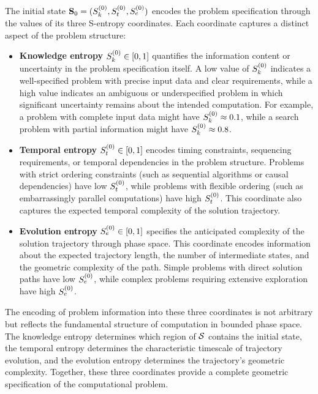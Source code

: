 The initial state $\mathbf{S}_0 = (S_k^{(0)}, S_t^{(0)}, S_e^{(0)})$ encodes the problem specification through the values of its three S-entropy coordinates. Each coordinate captures a distinct aspect of the problem structure:

\begin{itemize}
    \item \textbf{Knowledge entropy} $S_k^{(0)} \in [0,1]$ quantifies the information content or uncertainty in the problem specification itself. A low value of $S_k^{(0)}$ indicates a well-specified problem with precise input data and clear requirements, while a high value indicates an ambiguous or underspecified problem in which significant uncertainty remains about the intended computation. For example, a problem with complete input data might have $S_k^{(0)} \approx 0.1$, while a search problem with partial information might have $S_k^{(0)} \approx 0.8$.
    
    \item \textbf{Temporal entropy} $S_t^{(0)} \in [0,1]$ encodes timing constraints, sequencing requirements, or temporal dependencies in the problem structure. Problems with strict ordering constraints (such as sequential algorithms or causal dependencies) have low $S_t^{(0)}$, while problems with flexible ordering (such as embarrassingly parallel computations) have high $S_t^{(0)}$. This coordinate also captures the expected temporal complexity of the solution trajectory.
    
    \item \textbf{Evolution entropy} $S_e^{(0)} \in [0,1]$ specifies the anticipated complexity of the solution trajectory through phase space. This coordinate encodes information about the expected trajectory length, the number of intermediate states, and the geometric complexity of the path. Simple problems with direct solution paths have low $S_e^{(0)}$, while complex problems requiring extensive exploration have high $S_e^{(0)}$.
\end{itemize}

The encoding of problem information into these three coordinates is not arbitrary but reflects the fundamental structure of computation in bounded phase space. The knowledge entropy determines which region of $\mathcal{S}$ contains the initial state, the temporal entropy determines the characteristic timescale of trajectory evolution, and the evolution entropy determines the trajectory's geometric complexity. Together, these three coordinates provide a complete geometric specification of the computational problem.

